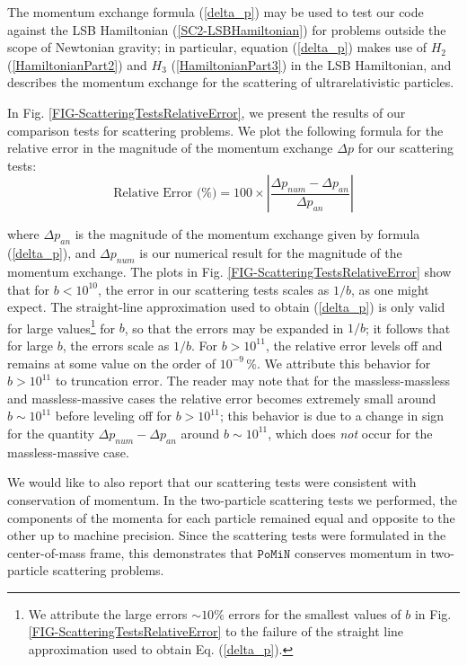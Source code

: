 \documentclass[aps,onecolumn,notitlepage,eqsecnum,nofootinbib,floatfix,superscriptaddress]{revtex4-1}
\newcommand{\codename}{\mathtt{PoMiN}}
\begin{document}
The momentum exchange formula (\ref{delta_p}) may be used to test our code against the LSB Hamiltonian (\ref{SC2-LSBHamiltonian}) for problems outside the scope of Newtonian gravity; in particular, equation (\ref{delta_p}) makes use of $H_2$ (\ref{HamiltonianPart2}) and $H_3$ (\ref{HamiltonianPart3}) in the LSB Hamiltonian, and describes the momentum exchange for the scattering of ultrarelativistic particles.

In Fig. \ref{FIG-ScatteringTestsRelativeError}, we present the results of our comparison tests for scattering problems. We plot the following formula for the relative error in the magnitude of the momentum exchange $\Delta p$ for our scattering tests:
\begin{equation} \label{relerror}
\text{Relative Error (\%)} = 100 \times \left| \frac{\Delta p_{num} - \Delta p_{an}}{\Delta p_{an}} \right|
\end{equation}

\noindent where $\Delta p_{an}$ is the magnitude of the momentum exchange given by formula (\ref{delta_p}), and $\Delta p_{num}$ is our numerical result for the magnitude of the momentum exchange. The plots in Fig. \ref{FIG-ScatteringTestsRelativeError} show that for $b<10^{10}$, the error in our scattering tests scales as $1/b$, as one might expect. The straight-line approximation used to obtain (\ref{delta_p}) is only valid for large values\footnote{We attribute the large errors $\sim 10 \%$ errors for the smallest values of $b$ in Fig. \ref{FIG-ScatteringTestsRelativeError} to the failure of the straight line approximation used to obtain Eq. (\ref{delta_p}).} for $b$, so that the errors may be expanded in $1/b$; it follows that for large $b$, the errors scale as $1/b$. For $b>10^{11}$, the relative error levels off and remains at some value on the order of $10^{-9} \, \%$. We attribute this behavior for $b>10^{11}$ to truncation error. The reader may note that for the massless-massless and massless-massive cases the relative error becomes extremely small around $b \sim 10^{11}$ before leveling off for $b>10^{11}$; this behavior is due to a change in sign for the quantity $\Delta p_{num} - \Delta p_{an}$ around $b \sim 10^{11}$, which does \textit{not} occur for the massless-massive case.

We would like to also report that our scattering tests were consistent with conservation of momentum. In the two-particle scattering tests we performed, the components of the momenta for each particle remained equal and opposite to the other up to machine precision. Since the scattering tests were formulated in the center-of-mass frame, this demonstrates that $\codename$ conserves momentum in two-particle scattering problems.
\end{document}
